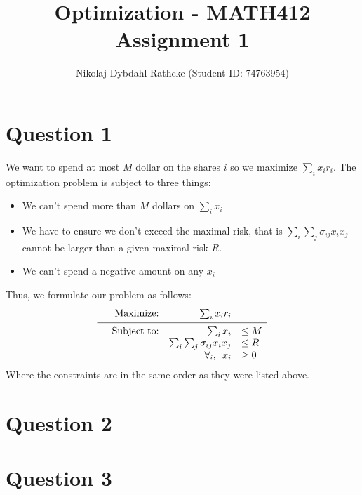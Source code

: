 \documentclass[a4paper, fleqn]{article}
\author{Nikolaj Dybdahl Rathcke (Student ID: 74763954)}
\title{Optimization - MATH412 \\ Assignment 1}
\newcommand\vgap{\noalign{\vskip 0.1cm}}
\begin{document}
\maketitle

\section{Question 1}
We want to spend at most $M$ dollar on the shares $i$ so we maximize $\sum_i x_ir_i$. The optimization problem is subject to three things:
\begin{itemize}
  \item We can't spend more than $M$ dollars on $\sum_i x_i$
  \item We have to ensure we don't exceed the maximal risk, that is $\sum_i \sum_j \sigma_{ij}x_ix_j$ cannot be larger than a given maximal risk $R$.
  \item We can't spend a negative amount on any $x_i$
\end{itemize}
Thus, we formulate our problem as follows:
\begin{equation}
  \begin{array}{rrrl}
    &\text{Maximize:}   & \sum_i x_ir_i  & \\
    \vgap
    \hline
    \vgap
    &\text{Subject to:} & \sum_i x_i & \leq M \\
    &                   & \sum_i \sum_j \sigma_{ij}x_ix_j &\leq R \\
    &                   & \forall_i\text{,}\ \ x_i & \geq 0
  \end{array}
\end{equation}
Where the constraints are in the same order as they were listed above.

\section{Question 2}


\section{Question 3}
\end{document}
